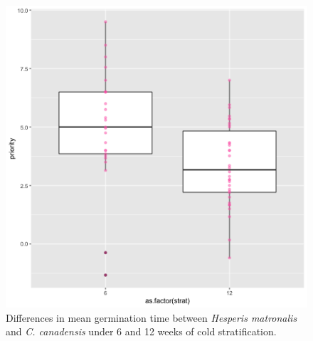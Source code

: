 \documentclass{article}\usepackage[]{graphicx}\usepackage[]{color}
\begin{document}
\begin{figure}[h!]
    \centering
\includegraphics[width=\textwidth]{..//figure/priority_treat.png}
   \caption{Differences in mean germination time between \textit{Hesperis matronalis} and \textit{C. canadensis} under 6 and 12 weeks of cold stratification.} 
   \label{fig:MGTsup}
\end{figure}
\end{document}
